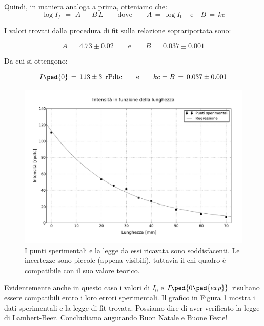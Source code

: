 Quindi, in maniera analoga a prima, otteniamo che:
\vspace{-1mm}
\begin{equation}
	\log{I_f} \,\,=\,\, A \,-\, B \, L \qquad \text{dove} \qquad A \,=\, \log{I_0} \quad \text{e} \quad B\,=\, kc
\end{equation}

I valori trovati dalla procedura di fit sulla relazione soprariportata sono:

\begin{equation*}
	A \,=\, 4.73 \pm 0.02 \qquad \text{e} \qquad B \,=\, 0.037 \pm 0.001
\end{equation*}

Da cui si ottengono:

\begin{equation}
	I\ped{0} \,=\, 113 \pm 3 \;\, \text{rPdtc} \qquad \text{e} \qquad kc = B \,=\, 0.037 \pm 0.001
\end{equation}

\begin{figure}
    \includegraphics[width=130mm]{g2.pdf}
    \caption{I punti sperimentali e la legge da essi ricavata sono soddisfacenti. Le incertezze sono piccole (appena visibili),
        tuttavia il chi quadro è compatibile con il suo valore teorico.}
    \label{fig:g2}
\end{figure}

Evidentemente anche in questo caso i valori di $I_0$ e $I\ped{0\ped{exp}}$ risultano essere compatibili entro i loro errori sperimentali.
Il grafico in Figura \ref{fig:g2} mostra i dati sperimentali e la legge di fit trovata.
Possiamo dire di aver verificato la legge di Lambert-Beer. Concludiamo augurando Buon Natale e Buone Feste!

